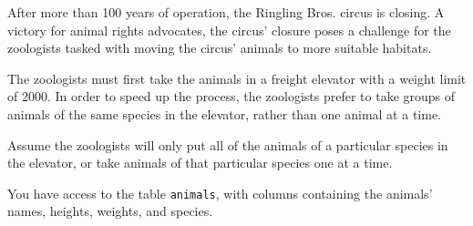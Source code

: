 \question After more than 100 years of operation, the Ringling Bros. circus is closing.  A victory for animal rights advocates, the circus' closure poses a challenge for the zoologists tasked with moving the circus' animals to more suitable habitats.
 
The zoologists must first take the animals in a freight elevator with a weight limit of 2000.  In order to speed up the process, the zoologists prefer to take groups of animals of the same species in the elevator, rather than one animal at a time.  

Assume the zoologists will only put all of the animals of a particular species in the elevator, or take animals of that particular species one at a time.

You have access to the table \lstinline$animals$, with columns containing the animals' names, heights, weights, and species.
